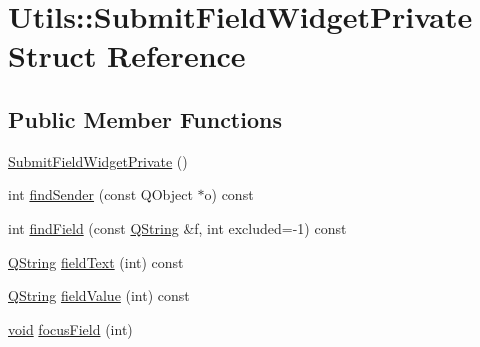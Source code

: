 \hypertarget{struct_utils_1_1_submit_field_widget_private}{\section{\-Utils\-:\-:\-Submit\-Field\-Widget\-Private \-Struct \-Reference}
\label{struct_utils_1_1_submit_field_widget_private}
}
\subsection*{\-Public \-Member \-Functions}
\begin{DoxyCompactItemize}
\item 
\hyperlink{struct_utils_1_1_submit_field_widget_private_a27be810d043cf134ce593b9055962877}{\-Submit\-Field\-Widget\-Private} ()
\item 
int \hyperlink{struct_utils_1_1_submit_field_widget_private_a7b35cb7631b89495bc76221ecc9f2796}{find\-Sender} (const \-Q\-Object $\ast$o) const 
\item 
int \hyperlink{struct_utils_1_1_submit_field_widget_private_a3f508eb85447b5ccbcc52b5dcce0ce4a}{find\-Field} (const \hyperlink{group___u_a_v_objects_plugin_gab9d252f49c333c94a72f97ce3105a32d}{\-Q\-String} \&f, int excluded=-\/1) const 
\item 
\hyperlink{group___u_a_v_objects_plugin_gab9d252f49c333c94a72f97ce3105a32d}{\-Q\-String} \hyperlink{struct_utils_1_1_submit_field_widget_private_a4dfbd3d5b1ce0fffbc4327078775eec2}{field\-Text} (int) const 
\item 
\hyperlink{group___u_a_v_objects_plugin_gab9d252f49c333c94a72f97ce3105a32d}{\-Q\-String} \hyperlink{struct_utils_1_1_submit_field_widget_private_adf117621941ece3a6b17bc506dc8d4c7}{field\-Value} (int) const 
\item 
\hyperlink{group___u_a_v_objects_plugin_ga444cf2ff3f0ecbe028adce838d373f5c}{void} \hyperlink{struct_utils_1_1_submit_field_widget_private_a06a07720110e7672707b04d2a459b670}{focus\-Field} (int)
\end{DoxyCompactItemize}
